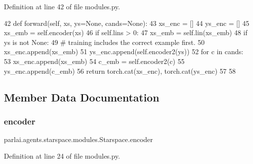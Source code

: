 Definition at line 42 of file modules.\+py.


\begin{DoxyCode}
42     \textcolor{keyword}{def }forward(self, xs, ys=None, cands=None):
43         xs\_enc = []
44         ys\_enc = []
45         xs\_emb = self.encoder(xs)
46         \textcolor{keywordflow}{if} self.lins > 0:
47             xs\_emb = self.lin(xs\_emb)
48         \textcolor{keywordflow}{if} ys \textcolor{keywordflow}{is} \textcolor{keywordflow}{not} \textcolor{keywordtype}{None}:
49             \textcolor{comment}{# training includes the correct example first.}
50             xs\_enc.append(xs\_emb)
51             ys\_enc.append(self.encoder2(ys))
52         \textcolor{keywordflow}{for} c \textcolor{keywordflow}{in} cands:
53             xs\_enc.append(xs\_emb)
54             c\_emb = self.encoder2(c)
55             ys\_enc.append(c\_emb)
56         \textcolor{keywordflow}{return} torch.cat(xs\_enc), torch.cat(ys\_enc)
57 
58 
\end{DoxyCode}


\subsection{Member Data Documentation}
\mbox{\label{classparlai_1_1agents_1_1starspace_1_1modules_1_1Starspace_aa93228651180a1901e55585fe9008002}} 
\subsubsection{\texorpdfstring{encoder}{encoder}}
{\footnotesize\ttfamily parlai.\+agents.\+starspace.\+modules.\+Starspace.\+encoder}



Definition at line 24 of file modules.\+py.

\mbox{\label{classparlai_1_1agents_1_1starspace_1_1modules_1_1Starspace_a7ead99b8e725174d82e97bd014bd26c9}} 
